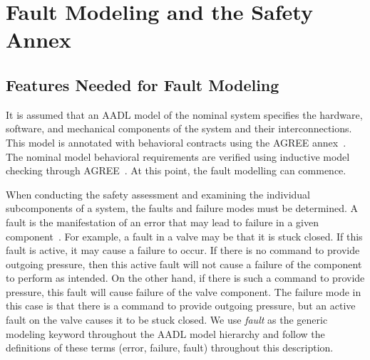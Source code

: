 \section{Fault Modeling and the Safety Annex}
\label{sec:fault_modeling}



\subsection{Features Needed for Fault Modeling}
It is assumed that an AADL model of the nominal system specifies the hardware, software, and mechanical components of the system and their interconnections. This model is annotated with behavioral contracts using the AGREE annex~\cite{NFM2012:CoGaMiWhLaLu}. The nominal model behavioral requirements are verified using inductive model checking through AGREE~\cite{2017arXiv171201222G}. At this point, the fault modelling can commence. 

When conducting the safety assessment and examining the individual subcomponents of a system, the faults and failure modes must be determined. A fault is the manifestation of an error that may lead to failure in a given component~\cite{SAE:ARP4754A}. For example, a fault in a valve may be that it is stuck closed. If this fault is active, it may cause a failure to occur. If there is no command to provide outgoing pressure, then this active fault will not cause a failure of the component to perform as intended. On the other hand, if there is such a command to provide pressure, this fault will cause failure of the valve component. The failure mode in this case is that there is a command to provide outgoing pressure, but an active fault on the valve causes it to be stuck closed. We use {\em fault} as the generic modeling keyword throughout the AADL model hierarchy and follow the definitions of these terms (error, failure, fault) throughout this description.


